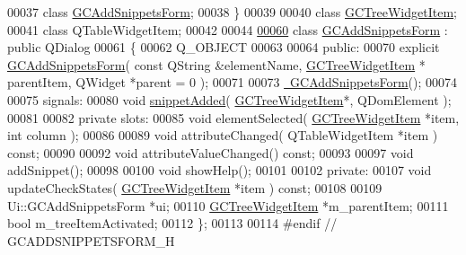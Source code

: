 \begin{DoxyCode}
00037   \textcolor{keyword}{class }\hyperlink{class_g_c_add_snippets_form}{GCAddSnippetsForm};
00038 \}
00039 
00040 \textcolor{keyword}{class }\hyperlink{class_g_c_tree_widget_item}{GCTreeWidgetItem};
00041 \textcolor{keyword}{class }QTableWidgetItem;
00042 
00044 
\hypertarget{gcaddsnippetsform_8h_source_l00060}{}\hyperlink{class_g_c_add_snippets_form}{00060} \textcolor{keyword}{class }\hyperlink{class_g_c_add_snippets_form}{GCAddSnippetsForm} : \textcolor{keyword}{public} QDialog
00061 \{
00062   Q\_OBJECT
00063   
00064 \textcolor{keyword}{public}:
00070   \textcolor{keyword}{explicit} \hyperlink{class_g_c_add_snippets_form_af1cfc60ffd8ac6b25f1d1a2dc49e311b}{GCAddSnippetsForm}( \textcolor{keyword}{const} QString &elementName, \hyperlink{class_g_c_tree_widget_item}{GCTreeWidgetItem} *
      parentItem, QWidget *parent = 0 );
00071 
00073   \hyperlink{class_g_c_add_snippets_form_a3a56853da9df0a69b7dfc0de3c762d9e}{~GCAddSnippetsForm}();
00074 
00075 signals:
00080   \textcolor{keywordtype}{void} \hyperlink{class_g_c_add_snippets_form_ae911d230e14e1473223a6f2b087febef}{snippetAdded}( \hyperlink{class_g_c_tree_widget_item}{GCTreeWidgetItem}*, QDomElement );
00081 
00082 \textcolor{keyword}{private} slots:
00085   \textcolor{keywordtype}{void} elementSelected( \hyperlink{class_g_c_tree_widget_item}{GCTreeWidgetItem} *item, \textcolor{keywordtype}{int} column );
00086 
00089   \textcolor{keywordtype}{void} attributeChanged( QTableWidgetItem *item ) \textcolor{keyword}{const};
00090 
00092   \textcolor{keywordtype}{void} attributeValueChanged() \textcolor{keyword}{const};
00093 
00097   \textcolor{keywordtype}{void} addSnippet();
00098 
00100   \textcolor{keywordtype}{void} showHelp();
00101   
00102 \textcolor{keyword}{private}:
00107   \textcolor{keywordtype}{void} updateCheckStates( \hyperlink{class_g_c_tree_widget_item}{GCTreeWidgetItem} *item ) \textcolor{keyword}{const};
00108 
00109   Ui::GCAddSnippetsForm *ui;
00110   \hyperlink{class_g_c_tree_widget_item}{GCTreeWidgetItem}   *m\_parentItem;
00111   \textcolor{keywordtype}{bool}                m\_treeItemActivated;
00112 \};
00113 
00114 \textcolor{preprocessor}{#endif // GCADDSNIPPETSFORM\_H}
\end{DoxyCode}
